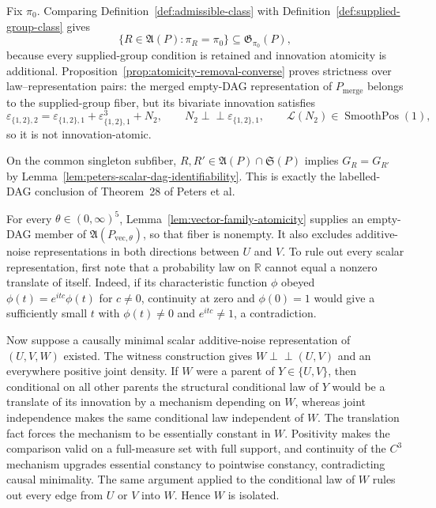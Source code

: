 Fix \(\pi_0\).  Comparing Definition~\ref{def:admissible-class} with Definition~\ref{def:supplied-group-class} gives
\[
\{R\in\mathfrak A(P):\pi_R=\pi_0\}\subseteq\mathfrak G_{\pi_0}(P),
\]
because every supplied-group condition is retained and innovation atomicity is additional.  Proposition~\ref{prop:atomicity-removal-converse} proves strictness over law--representation pairs: the merged empty-DAG representation of \(P_{\mathrm{merge}}\) belongs to the supplied-group fiber, but its bivariate innovation satisfies
\[
\varepsilon_{\{1,2\},2}
=\varepsilon_{\{1,2\},1}+\varepsilon_{\{1,2\},1}^{3}+N_2,
\qquad
N_2\perp\!\!\!\perp\varepsilon_{\{1,2\},1},
\qquad
\mathcal L(N_2)\in\operatorname{SmoothPos}(1),
\]
so it is not innovation-atomic.

On the common singleton subfiber, \(R,R'\in\mathfrak A(P)\cap\mathfrak S(P)\) implies \(G_R=G_{R'}\) by Lemma~\ref{lem:peters-scalar-dag-identifiability}.  This is exactly the labelled-DAG conclusion of Theorem~28 of Peters et al.

For every \(\theta\in(0,\infty)^5\), Lemma~\ref{lem:vector-family-atomicity} supplies an empty-DAG member of \(\mathfrak A(P_{\mathrm{vec},\theta})\), so that fiber is nonempty.  It also excludes additive-noise representations in both directions between \(U\) and \(V\).  To rule out every scalar representation, first note that a probability law on \(\mathbb R\) cannot equal a nonzero translate of itself.  Indeed, if its characteristic function \(\phi\) obeyed \(\phi(t)=e^{itc}\phi(t)\) for \(c\neq0\), continuity at zero and \(\phi(0)=1\) would give a sufficiently small \(t\) with \(\phi(t)\neq0\) and \(e^{itc}\neq1\), a contradiction.

Now suppose a causally minimal scalar additive-noise representation of \((U,V,W)\) existed.  The witness construction gives \(W\perp\!\!\!\perp(U,V)\) and an everywhere positive joint density.  If \(W\) were a parent of \(Y\in\{U,V\}\), then conditional on all other parents the structural conditional law of \(Y\) would be a translate of its innovation by a mechanism depending on \(W\), whereas joint independence makes the same conditional law independent of \(W\).  The translation fact forces the mechanism to be essentially constant in \(W\).  Positivity makes the comparison valid on a full-measure set with full support, and continuity of the \(C^3\) mechanism upgrades essential constancy to pointwise constancy, contradicting causal minimality.  The same argument applied to the conditional law of \(W\) rules out every edge from \(U\) or \(V\) into \(W\).  Hence \(W\) is isolated.

